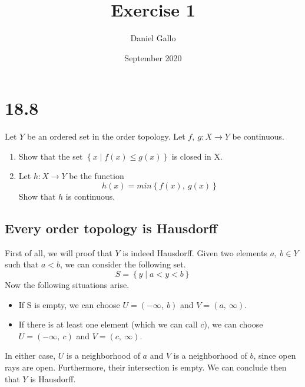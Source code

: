 \documentclass{article}
\title{Exercise 1}
\author{Daniel Gallo}
\date{September 2020}
\begin{document}
\maketitle
\section*{18.8}
Let $Y$ be an ordered set in the order topology. Let $f,\ g \colon X \rightarrow Y$ be continuous.
\begin{enumerate}
    \item Show that the set $\left\{x \mid f(x) \leq g(x)\right\}$ is closed in X.
    \item Let $h\colon X \rightarrow Y$ be the function
    \begin{equation*}
        h(x) = min\left\{f(x),\ g(x)\right\}
    \end{equation*}
    Show that $h$ is continuous.
\end{enumerate}
\subsection*{Every order topology is Hausdorff}
First of all, we will proof that $Y$ is indeed Hausdorff. Given two elements $a,\ b \in Y$ such that $a < b$, we can consider the following set.
\begin{equation*}
    S = \left\{y \mid a < y < b\right\}
\end{equation*}
Now the following situations arise.
\begin{itemize}
    \item If S is empty, we can choose $U = \left(-\infty,\ b\right)$ and $V = \left(a,\ \infty\right)$.
    \item If there is at least one element (which we can call $c$), we can choose $U = \left(-\infty,\ c\right)$ and $V = \left(c,\ \infty\right)$.
\end{itemize}
In either case, $U$ is a neighborhood of $a$ and $V$ is a neighborhood of $b$, since open rays are open. Furthermore, their intersection is empty. We can conclude then that $Y$ is Hausdorff.
\end{document}
